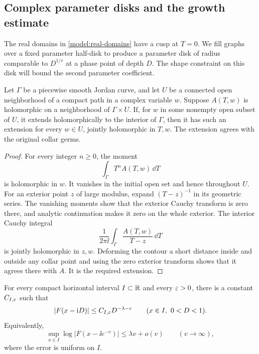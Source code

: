 \subsection{Complex parameter disks and the growth estimate}
\label{model:growth-subsection}

The real domains in \eqref{model:real-domains} have a cusp at
\(T=0\).  We fill graphs over a fixed parameter half-disk to
produce a parameter disk of radius comparable to \(D^{1/r}\)
at a phase point of depth \(D\).  The shape constraint on this
disk will bound the second parameter coefficient.

\begin{lemma}
\label{model:graph-filling}
Let \(\Gamma\) be a piecewise smooth Jordan curve, and let \(U\)
be a connected open neighborhood of a compact path in a complex
variable \(w\).  Suppose \(A(T,w)\) is holomorphic on a
neighborhood of \(\Gamma\times U\).
If, for \(w\) in some nonempty open subset of \(U\), it extends
holomorphically to the interior of \(\Gamma\), then it has such
an extension for every \(w\in U\), jointly holomorphic in \(T,w\).
The extension agrees with the original collar germs.
\end{lemma}

\begin{proof}
For every integer \(n\ge0\), the moment
\[
 \int_\Gamma T^n A(T,w)\,\dd T
\]
is holomorphic in \(w\).  It vanishes in the initial open set
and hence throughout \(U\).  For an exterior point \(z\) of
large modulus, expand \((T-z)^{-1}\) in its geometric series.
The vanishing moments show that the exterior Cauchy transform
is zero there, and analytic continuation makes it zero on the
whole exterior.  The interior Cauchy integral
\[
 \frac{1}{2\pi\ii}\int_\Gamma
       \frac{A(T,w)}{T-z}\,\dd T
\]
is jointly holomorphic in \(z,w\).  Deforming the contour a
short distance inside and outside any collar point and using
the zero exterior transform shows that it agrees there with
\(A\).  It is the required extension.
\end{proof}

\begin{proposition}
\label{prop:model-growth}
For every compact horizontal interval \(I\subset\mathbb R\) and every
\(\varepsilon>0\), there is a constant \(C_{I,\varepsilon}\) such that
\begin{equation}
\label{model:power-growth}
 |F(x-\mathrm i D)|\le C_{I,\varepsilon}D^{-\lambda-\varepsilon}
 \qquad(x\in I,\ 0<D<1).
\end{equation}
Equivalently,
\begin{equation}
\label{model:log-growth}
 \sup_{x\in I}\log|F(x-\ii e^{-v})|
       \le\lambda v+o(v)\qquad(v\to\infty),
\end{equation}
where the error is uniform on \(I\).
\end{proposition}

